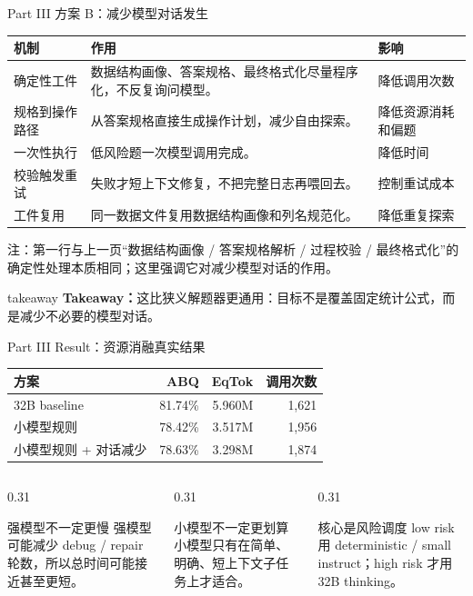 \documentclass[aspectratio=169,UTF8]{ctexbeamer}
\newcommand{\takeaway}[1]{%
  \vspace{0.18em}
  \begin{beamercolorbox}[wd=\textwidth,sep=0.42ex,rounded=true,leftskip=0.75em,rightskip=0.75em]{takeaway}
    \scriptsize\textbf{\textcolor{DWBlue}{Takeaway：}}#1
  \end{beamercolorbox}
}
\begin{document}
\begin{frame}{Part III 方案 B：减少模型对话发生}
\small
\begin{tabularx}{\textwidth}{p{} X p{}}
\toprule
机制 & 作用 & 影响 \\
\midrule
确定性工件 & 数据结构画像、答案规格、最终格式化尽量程序化，不反复询问模型。 & 降低调用次数 \\
规格到操作路径 & 从答案规格直接生成操作计划，减少自由探索。 & 降低资源消耗和偏题 \\
一次性执行 & 低风险题一次模型调用完成。 & 降低时间 \\
校验触发重试 & 失败才短上下文修复，不把完整日志再喂回去。 & 控制重试成本 \\
工件复用 & 同一数据文件复用数据结构画像和列名规范化。 & 降低重复探索 \\
\bottomrule
\end{tabularx}
\vspace{0.35em}
{\scriptsize\textcolor{DWGray}{注：第一行与上一页“数据结构画像 / 答案规格解析 / 过程校验 / 最终格式化”的确定性处理本质相同；这里强调它对减少模型对话的作用。}}
\vfill
\takeaway{这比狭义解题器更通用：目标不是覆盖固定统计公式，而是减少不必要的模型对话。}
\end{frame}

\begin{frame}{Part III Result：资源消融真实结果}
\footnotesize
\begin{center}
\begin{tabularx}{0.88\textwidth}{X r r r}
\toprule
方案 & ABQ & EqTok & 调用次数 \\
\midrule
32B baseline & 81.74\% & 5.960M & 1,621 \\
小模型规则 & 78.42\% & 3.517M & 1,956 \\
小模型规则 + 对话减少 & 78.63\% & 3.298M & 1,874 \\
\bottomrule
\end{tabularx}
\end{center}
\vspace{0.65em}
\begin{columns}[T]
\begin{column}{0.31\textwidth}
\begin{block}{强模型不一定更慢}
强模型可能减少 debug / repair 轮数，所以总时间可能接近甚至更短。
\end{block}
\end{column}
\begin{column}{0.31\textwidth}
\begin{block}{小模型不一定更划算}
小模型只有在简单、明确、短上下文子任务上才适合。
\end{block}
\end{column}
\begin{column}{0.31\textwidth}
\begin{block}{核心是风险调度}
low risk 用 deterministic / small instruct；high risk 才用 32B thinking。
\end{block}
\end{column}
\end{columns}
\end{frame}
\end{document}
